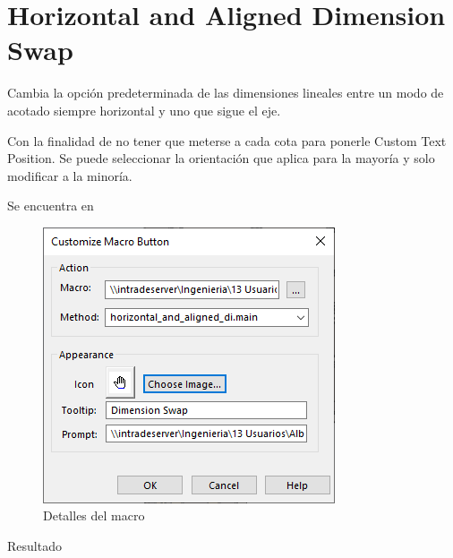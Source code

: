 \documentclass[12pt,letterpaper,final]{report}
\begin{document}
\section{Horizontal and Aligned Dimension Swap}

Cambia la opción predeterminada de las dimensiones lineales entre un modo de acotado siempre horizontal y uno que sigue el eje. 

Con la finalidad de no tener que meterse a cada cota para ponerle Custom Text Position. Se puede seleccionar la orientación que aplica para la mayoría y solo modificar a la minoría.

Se encuentra en 

\begin{figure}[H]
	\centering
	\includegraphics[width=0.55\linewidth, height=0.5\textheight,keepaspectratio]{Imagenes/solidworks_macro_11}
	\caption{Detalles del macro}
	\label{fig:solidworksmacro11}
\end{figure}

{\LARGE Resultado}
\end{document}
